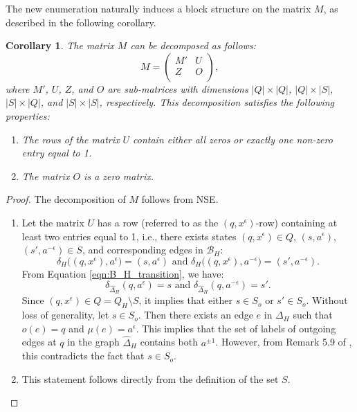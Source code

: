 \documentclass{article}
\newtheorem{mycor}{Corollary}[section]
\newcommand{\B}{\mathcal{B}}
\newcommand{\e}{\epsilon}
\begin{document}
    The new enumeration naturally induces a block structure on the matrix $M$, as described in the following corollary.
    
     \begin{mycor}\label{cor:M_partition} The matrix $M$ can be decomposed as follows:
            \begin{equation}
                M = \left(
            \begin{array}{cc}
             M' & U \\
             Z & O \\
            \end{array}
            \right), \label{eqn:decomposition_M}
            \end{equation}
            where $M'$, $U$, $Z$, and $O$ are sub-matrices with dimensions $|Q|\times|Q|$, $|Q|\times|S|$, $|S|\times|Q|$, and $|S|\times|S|$, respectively. This decomposition satisfies the following properties:
            \begin{enumerate}
                \item \label{cor:C}The rows of the matrix $U$ contain either all zeros or exactly one non-zero entry equal to 1.
                \item \label{cor:O}The matrix $O$ is a zero matrix.
            \end{enumerate}
    \end{mycor}
    \begin{proof}
        The decomposition of $M$ follows from NSE. 
            \begin{enumerate}
                \item Let the matrix $U$ has a row (referred to as the $(q,x^{\e})$-row) containing at least two entries equal to 1, i.e., there exists states $(q,x^{\e}) \in Q$, $(s,a^{\e})$, $(s',a^{-\e}) \in S$, and corresponding edges in $\B_H$:
                $$ \delta_H\big((q,x^{\e}),a^{\e}\big)= (s,a^{\e}) \textrm{ and } \delta_H\big((q,x^{\e}),a^{-\e}\big)= (s',a^{-\e}).$$
                From Equation \eqref{eqn:B_H_transition}, we have:
                $$ \delta_{\widehat{\Delta}_H}\left(q,a^{\e}\right)= s \textrm{ and } \delta_{\widehat{\Delta}_H}\left(q,a^{-\e}\right)= s'.$$
                Since $(q,x^{\e}) \in Q = Q_H\setminus S$, it implies that either $s \in S_o$ or $s' \in S_o.$ Without loss of generality, let $s \in S_o$. Then there exists an edge $e$ in $\Delta_H$ such that $o(e) = q$ and $\mu(e) = a^{\e}$. This implies that the set of labels of outgoing edges at $q$ in the graph $\widehat{\Delta}_H$ contains both $a^{\pm 1}$. However, from Remark 5.9 of \cite{ascari2021fine}, this contradicts the fact that $s \in S_o$.
                \item This statement follows directly from the definition of the set $S$.
            \end{enumerate}
    \end{proof}
\end{document}
